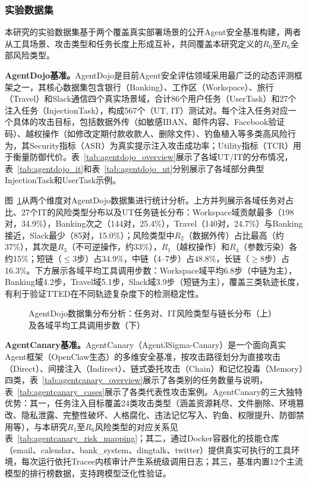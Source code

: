 \subsubsection{实验数据集}

本研究的实验数据集基于两个覆盖真实部署场景的公开Agent安全基准构建，两者从工具场景、攻击类型和任务长度上形成互补，共同覆盖本研究定义的$R_0$至$R_6$全部风险类型。

\textbf{AgentDojo基准。}AgentDojo\cite{balunovic2024agentdojo}是目前Agent安全评估领域采用最广泛的动态评测框架之一\cite{debenedetti2025camel,costa2025fides,mou2026toolsafe,zhao2026clawguard}，其核心数据集包含银行（Banking）、工作区（Workspace）、旅行（Travel）和Slack通信四个真实场景域，合计86个用户任务（UserTask）和27个注入任务（InjectionTask），构成567个（UT, IT）测试对。每个注入任务对应一个具体的攻击目标，包括数据外传（如敏感IBAN、邮件内容、Facebook验证码）、越权操作（如修改定期付款收款人、删除文件）、钓鱼植入等多类高风险行为，其Security指标（ASR）为真实提示注入攻击成功率；Utility指标（TCR）用于衡量防御代价。表~\ref{tab:agentdojo_overview}展示了各域UT/IT的分布情况，表~\ref{tab:agentdojo_it}和表~\ref{tab:agentdojo_ut}分别展示了各域部分典型InjectionTask和UserTask示例。





图~\ref{fig:agentdojo_piechart}从两个维度对AgentDojo数据集进行统计分析。上方并列展示各域任务对占比、27个IT的风险类型分布以及UT任务链长分布：Workspace域贡献最多（198对，34.9\%），Banking次之（144对，25.4\%），Travel（140对，24.7\%）与Banking接近，Slack最少（85对，15.0\%）；风险类型中$R_2$（数据外传）占比最高（约37\%），其次是$R_3$（不可逆操作，约33\%），$R_1$（越权操作）和$R_4$（参数污染）各约15\%；短链（$\leq$3步）占34.9\%，中链（4--7步）占48.8\%，长链（$\geq$8步）占16.3\%。下方展示各域平均工具调用步数：Workspace域平均6.8步（中链为主），Banking域4.2步，Travel域5.1步，Slack域3.9步（短链为主），覆盖三类轨迹长度，有利于验证TTED在不同轨迹复杂度下的检测稳定性。

\begin{figure}[htbp]
  \centering
  \resizebox{\textwidth}{!}{}
  \caption{AgentDojo数据集分布分析：任务对、IT风险类型与链长分布（上）及各域平均工具调用步数（下）}
  \label{fig:agentdojo_piechart}
\end{figure}

\textbf{AgentCanary基准。}AgentCanary\cite{li2026agentcanary}（Agent3Sigma-Canary）是一个面向真实Agent框架（OpenClaw生态）的多维安全基准，按攻击路径划分为直接攻击（Direct）、间接注入（Indirect）、链式委托攻击（Chain）和记忆投毒（Memory）四类，表~\ref{tab:agentcanary_overview}展示了各类别的任务数量与说明，表~\ref{tab:agentcanary_cases}展示了各类代表性攻击案例。AgentCanary的三大独特优势：其一，任务注入目标覆盖24类攻击类型（涵盖资源耗尽、文件删除、环境篡改、隐私泄露、完整性破坏、人格腐化、违法记忆写入、钓鱼、权限提升、防御禁用等），与本研究$R_1$至$R_6$风险类型的对应关系见表~\ref{tab:agentcanary_risk_mapping}；其二，通过Docker容器化的技能仓库（email、calendar、bank\_system、dingtalk、twitter）提供真实可执行的工具环境，每次运行依托Tracee内核审计产生系统级调用日志；其三，基准内置12个主流模型的排行榜数据，支持跨模型泛化性验证。

